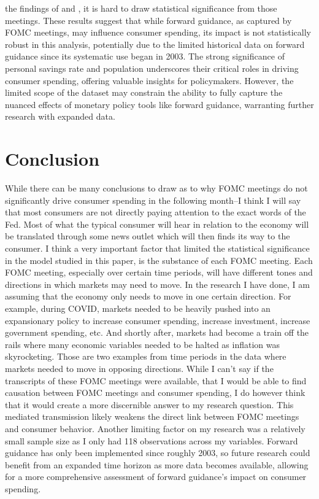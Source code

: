 \documentclass[12pt,english]{article}
\begin{document}
the findings of \cite{HAGEDORN20191} and \cite{mckay2016power}, it is hard to draw statistical significance from those meetings. These results suggest that while forward guidance, as captured by FOMC meetings, may influence consumer spending, its impact is not statistically robust in this analysis, potentially due to the limited historical data on forward guidance since its systematic use began in 2003. The strong significance of personal savings rate and population underscores their critical roles in driving consumer spending, offering valuable insights for policymakers. However, the limited scope of the dataset may constrain the ability to fully capture the nuanced effects of monetary policy tools like forward guidance, warranting further research with expanded data.


\section{Conclusion}\label{sec:conclusion}
While there can be many conclusions to draw as to why FOMC meetings do not significantly drive consumer spending in the following month--I think I will say that most consumers are not directly paying attention to the exact words of the Fed. Most of what the typical consumer will hear in relation to the economy will be translated through some news outlet which will then finds its way to the consumer. I think a very important factor that limited the statistical significance in the model studied in this paper, is the substance of each FOMC meeting. Each FOMC meeting, especially over certain time periods, will have different tones and directions in which markets may need to move. In the research I have done, I am assuming that the economy only needs to move in one certain direction. For example, during COVID, markets needed to be heavily pushed into an expansionary policy to increase consumer spending, increase investment, increase government spending, etc. And shortly after, markets had become a train off the rails where many economic variables needed to be halted as inflation was skyrocketing. Those are two examples from time periods in the data where markets needed to move in opposing directions. While I can't say if the transcripts of these FOMC meetings were available, that I would be able to find causation between FOMC meetings and consumer spending, I do however think that it would create a more discernible answer to my research question. This mediated transmission likely weakens the direct link between FOMC meetings and consumer behavior. Another limiting factor on my research was a relatively small sample size as I only had 118 observations across my variables. Forward guidance has only been implemented since roughly 2003, so future research could benefit from an expanded time horizon as more data becomes available, allowing for a more comprehensive assessment of forward guidance's impact on consumer spending.
\end{document}
